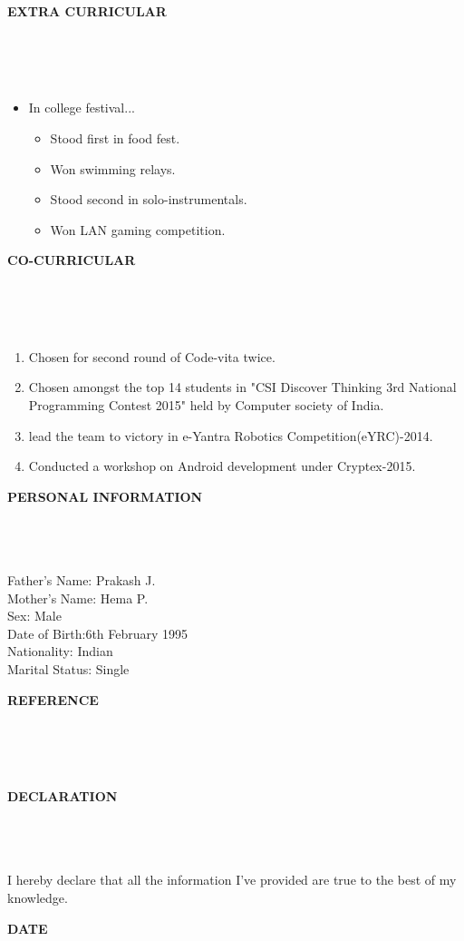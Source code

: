 \documentclass[a4paper,10pt]{article}
\newcommand{\lsep}{-0.5cm}
\newcommand{\resheading}[1]{{\small \colorbox{mygrey}{\begin{minipage}{0.975\textwidth}{\textbf{#1 \vphantom{p\^{E}}}}\end{minipage}}}}
\begin{document}
\resheading{\textbf{EXTRA CURRICULAR} }\\[\lsep]
\\ \\


\begin{itemize}
		\item \noindent In college festival...
		\begin{itemize}
			\item Stood first in food fest.
			\item Won swimming relays.
			\item Stood second in solo-instrumentals.
			\item Won LAN gaming competition.
		\end{itemize}
\end{itemize}

\resheading{\textbf{CO-CURRICULAR} }\\[\lsep]
\\ \\
\begin{enumerate}
			\item \noindent Chosen for second round of Code-vita twice.
			\item \noindent Chosen amongst the top 14 students in "CSI Discover Thinking 3rd National Programming Contest 2015" held by Computer society of India.
			\item \noindent lead the team to victory in e-Yantra Robotics Competition(eYRC)-2014.
			\item \noindent Conducted a workshop on Android development under Cryptex-2015.
\end{enumerate}

\resheading{\textbf{PERSONAL INFORMATION} }\\[\lsep]
\\ \\
\indent Father’s Name: Prakash J. \\
\indent Mother’s Name: Hema P. \\
\indent Sex: Male \\
\indent Date of Birth:6th February 1995 \\
\indent Nationality: Indian \\
\indent Marital Status: Single \\

\resheading{\textbf{REFERENCE} }\\[\lsep]
\\ \\


\resheading{\textbf{DECLARATION} }\\[\lsep]
\\ \\
\indent I hereby declare that all the information I've provided are true to the best of my knowledge.


\resheading{\textbf{DATE} }\\[\lsep]
\\ \\
\end{document}

